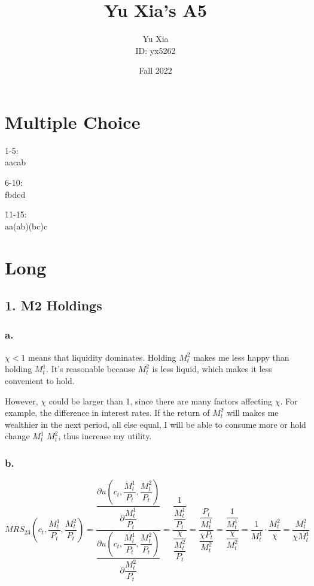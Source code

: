 \documentclass{article}
\author{Yu Xia \\ ID: yx5262}
\title{\textbf{Yu Xia's A5}}
\date{Fall 2022}
\begin{document}
\maketitle

\nocite{*}

\section*{Multiple Choice}

1-5:\\
aacab

6-10:\\
fbdcd

11-15:\\
aa(ab)(bc)c

\section*{Long}

\subsection*{1. M2 Holdings}

\subsubsection*{a.}

$\chi<1$ means that liquidity dominates. Holding $M^{2}_{t}$ makes me less happy than holding $M^{1}_{t}$. It's reasonable because $M^{2}_{t}$ is less liquid, which makes it less convenient to hold. 

However, $\chi$ could be larger than 1, since there are many factors affecting $\chi$. For example, the difference in interest rates. If the return of $M^{2}_{t}$ will makes me wealthier in the next period, all else equal, I will be able to consume more or hold change $M^{1}_{t}$ $M^{2}_{t}$, thus increase my utility.  

\subsubsection*{b.}

$MRS_{23}\left(c_{t}, \dfrac{M^{1}_{t}}{P_{t}},\dfrac{M^{2}_{t}}{P_{t}}\right)=\dfrac{\dfrac{\partial u\left(c_{t}, \dfrac{M^{1}_{t}}{P_{t}}, \dfrac{M^{2}_{t}}{P_{t}}\right)}{\partial \dfrac{M^{1}_{t}}{P_{t}}}}{\dfrac{\partial u\left(c_{t}, \dfrac{M^{1}_{t}}{P_{t}}, \dfrac{M^{2}_{t}}{P_{t}}\right)}{\partial \dfrac{M^{2}_{t}}{P_{t}}}}=\dfrac{\dfrac{1}{\dfrac{M^{1}_{t}}{P_{t}}}}{\dfrac{\chi}{\dfrac{M^{2}_{t}}{P_{t}}}}=\dfrac{\dfrac{P_{t}}{M^{1}_{t}}}{\dfrac{\chi P_{t}}{M^{2}_{t}}}=\dfrac{\dfrac{1}{M^{1}_{t}}}{\dfrac{\chi}{M^{2}_{t}}}=\dfrac{1}{M^{1}_{t}}\cdot\dfrac{M^{2}_{t}}{\chi}=\dfrac{M^{2}_{t}}{\chi M^{1}_{t}}$
\end{document}
